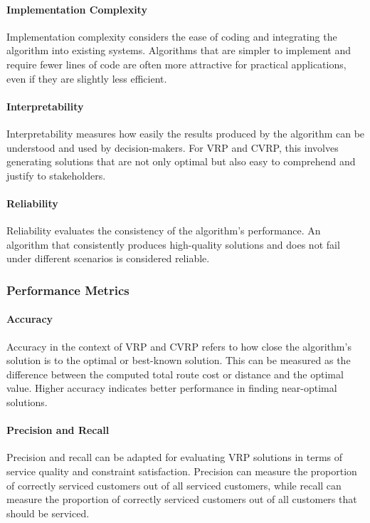 \documentclass[
]{article}
\begin{document}
  \paragraph{Implementation Complexity} Implementation complexity considers the ease of coding and integrating the algorithm into existing systems. Algorithms that are simpler to implement and require fewer lines of code are often more attractive for practical applications, even if they are slightly less efficient.
  
  \paragraph{Interpretability} Interpretability measures how easily the results produced by the algorithm can be understood and used by decision-makers. For VRP and CVRP, this involves generating solutions that are not only optimal but also easy to comprehend and justify to stakeholders.
  
  \paragraph{Reliability} Reliability evaluates the consistency of the algorithm’s performance. An algorithm that consistently produces high-quality solutions and does not fail under different scenarios is considered reliable.
  
  \subsubsection{Performance Metrics}
  
  \paragraph{Accuracy} Accuracy in the context of VRP and CVRP refers to how close the algorithm’s solution is to the optimal or best-known solution. This can be measured as the difference between the computed total route cost or distance and the optimal value. Higher accuracy indicates better performance in finding near-optimal solutions.
  
  \paragraph{Precision and Recall} Precision and recall can be adapted for evaluating VRP solutions in terms of service quality and constraint satisfaction. Precision can measure the proportion of correctly serviced customers out of all serviced customers, while recall can measure the proportion of correctly serviced customers out of all customers that should be serviced.
  
\end{document}
